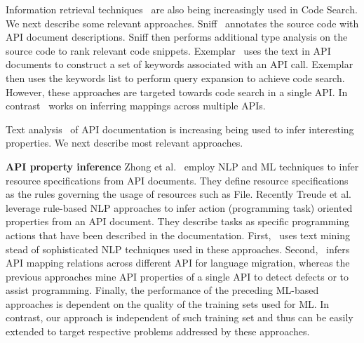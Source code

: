 

Information retrieval techniques~\cite{chatterjee2009sniff,grechanik2010search,kim2010towards,Reiss2009SCS} are also being increasingly used in Code Search. We next describe some relevant approaches.
Sniff~\cite{chatterjee2009sniff} annotates the source code with API document descriptions. 
Sniff then performs additional type analysis on the source code to rank relevant code snippets. 
Exemplar~\cite{grechanik2010search} uses the text in API documents to construct a set of keywords associated with an API call. Exemplar then uses the keywords list to perform query expansion to achieve code search. However, these approaches are targeted towards code search in a single API. In contrast \tool\ works on inferring mappings across multiple APIs. 


Text analysis~\cite{Dekel2009, pandita12:inferring,Zhou2008,Little2009, zhong09SE} of API documentation is increasing being used to infer interesting properties. We next describe most relevant approaches.

\textbf{API property inference}
Zhong et al.~\cite{zhong09SE} employ NLP and ML techniques to infer resource specifications from API documents.
They define resource specifications as the rules governing the usage of resources such as File.
Recently Treude et al.~\cite{treudeextracting} leverage rule-based NLP approaches to infer action (programming task) oriented properties from an API document. They describe tasks as specific programming actions that have been described in the documentation. 
First, \tool\ uses text mining stead of sophisticated NLP techniques used in these approaches.
Second, \tool\ infers API mapping relations across different API for language migration, whereas the previous approaches mine API properties of a single API to detect defects or to assist programming.
Finally, the performance of the preceding ML-based approaches is dependent on the quality of the training sets used for ML. In contrast, our approach is independent of such training set and thus can be easily extended to target respective problems addressed by these approaches.


